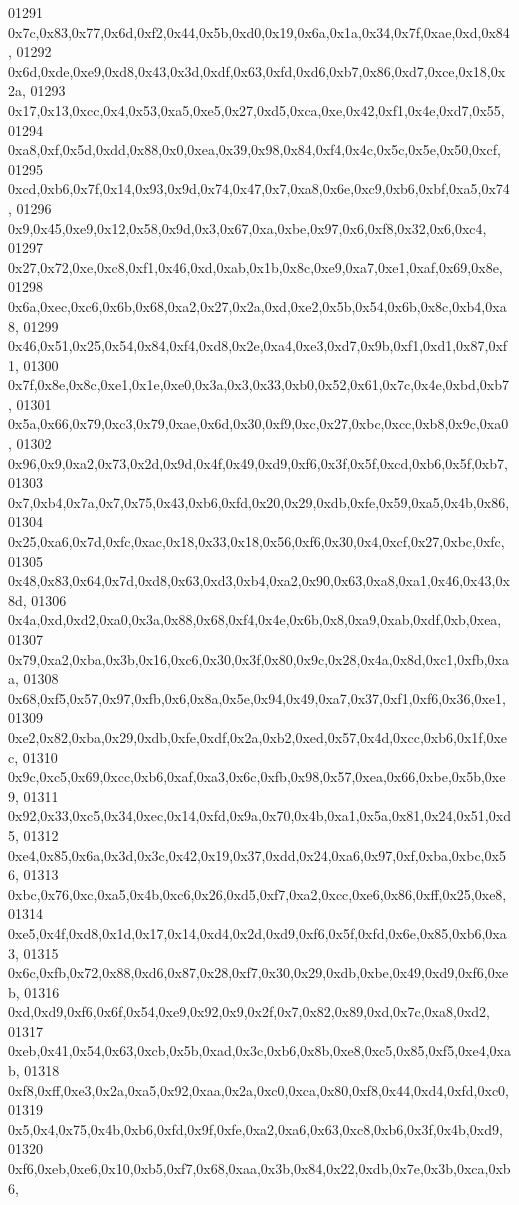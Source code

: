 \begin{DoxyCode}
01291   0x7c,0x83,0x77,0x6d,0xf2,0x44,0x5b,0xd0,0x19,0x6a,0x1a,0x34,0x7f,0xae,0xd,0x84,
01292   0x6d,0xde,0xe9,0xd8,0x43,0x3d,0xdf,0x63,0xfd,0xd6,0xb7,0x86,0xd7,0xce,0x18,0x2a,
01293   0x17,0x13,0xcc,0x4,0x53,0xa5,0xe5,0x27,0xd5,0xca,0xe,0x42,0xf1,0x4e,0xd7,0x55,
01294   0xa8,0xf,0x5d,0xdd,0x88,0x0,0xea,0x39,0x98,0x84,0xf4,0x4c,0x5c,0x5e,0x50,0xcf,
01295   0xcd,0xb6,0x7f,0x14,0x93,0x9d,0x74,0x47,0x7,0xa8,0x6e,0xc9,0xb6,0xbf,0xa5,0x74,
01296   0x9,0x45,0xe9,0x12,0x58,0x9d,0x3,0x67,0xa,0xbe,0x97,0x6,0xf8,0x32,0x6,0xc4,
01297   0x27,0x72,0xe,0xc8,0xf1,0x46,0xd,0xab,0x1b,0x8c,0xe9,0xa7,0xe1,0xaf,0x69,0x8e,
01298   0x6a,0xec,0xc6,0x6b,0x68,0xa2,0x27,0x2a,0xd,0xe2,0x5b,0x54,0x6b,0x8c,0xb4,0xa8,
01299   0x46,0x51,0x25,0x54,0x84,0xf4,0xd8,0x2e,0xa4,0xe3,0xd7,0x9b,0xf1,0xd1,0x87,0xf1,
01300   0x7f,0x8e,0x8c,0xe1,0x1e,0xe0,0x3a,0x3,0x33,0xb0,0x52,0x61,0x7c,0x4e,0xbd,0xb7,
01301   0x5a,0x66,0x79,0xc3,0x79,0xae,0x6d,0x30,0xf9,0xc,0x27,0xbc,0xcc,0xb8,0x9c,0xa0,
01302   0x96,0x9,0xa2,0x73,0x2d,0x9d,0x4f,0x49,0xd9,0xf6,0x3f,0x5f,0xcd,0xb6,0x5f,0xb7,
01303   0x7,0xb4,0x7a,0x7,0x75,0x43,0xb6,0xfd,0x20,0x29,0xdb,0xfe,0x59,0xa5,0x4b,0x86,
01304   0x25,0xa6,0x7d,0xfc,0xac,0x18,0x33,0x18,0x56,0xf6,0x30,0x4,0xcf,0x27,0xbc,0xfc,
01305   0x48,0x83,0x64,0x7d,0xd8,0x63,0xd3,0xb4,0xa2,0x90,0x63,0xa8,0xa1,0x46,0x43,0x8d,
01306   0x4a,0xd,0xd2,0xa0,0x3a,0x88,0x68,0xf4,0x4e,0x6b,0x8,0xa9,0xab,0xdf,0xb,0xea,
01307   0x79,0xa2,0xba,0x3b,0x16,0xc6,0x30,0x3f,0x80,0x9c,0x28,0x4a,0x8d,0xc1,0xfb,0xaa,
01308   0x68,0xf5,0x57,0x97,0xfb,0x6,0x8a,0x5e,0x94,0x49,0xa7,0x37,0xf1,0xf6,0x36,0xe1,
01309   0xe2,0x82,0xba,0x29,0xdb,0xfe,0xdf,0x2a,0xb2,0xed,0x57,0x4d,0xcc,0xb6,0x1f,0xec,
01310   0x9c,0xc5,0x69,0xcc,0xb6,0xaf,0xa3,0x6c,0xfb,0x98,0x57,0xea,0x66,0xbe,0x5b,0xe9,
01311   0x92,0x33,0xc5,0x34,0xec,0x14,0xfd,0x9a,0x70,0x4b,0xa1,0x5a,0x81,0x24,0x51,0xd5,
01312   0xe4,0x85,0x6a,0x3d,0x3c,0x42,0x19,0x37,0xdd,0x24,0xa6,0x97,0xf,0xba,0xbc,0x56,
01313   0xbc,0x76,0xc,0xa5,0x4b,0xc6,0x26,0xd5,0xf7,0xa2,0xcc,0xe6,0x86,0xff,0x25,0xe8,
01314   0xe5,0x4f,0xd8,0x1d,0x17,0x14,0xd4,0x2d,0xd9,0xf6,0x5f,0xfd,0x6e,0x85,0xb6,0xa3,
01315   0x6c,0xfb,0x72,0x88,0xd6,0x87,0x28,0xf7,0x30,0x29,0xdb,0xbe,0x49,0xd9,0xf6,0xeb,
01316   0xd,0xd9,0xf6,0x6f,0x54,0xe9,0x92,0x9,0x2f,0x7,0x82,0x89,0xd,0x7c,0xa8,0xd2,
01317   0xeb,0x41,0x54,0x63,0xcb,0x5b,0xad,0x3c,0xb6,0x8b,0xe8,0xc5,0x85,0xf5,0xe4,0xab,
01318   0xf8,0xff,0xe3,0x2a,0xa5,0x92,0xaa,0x2a,0xc0,0xca,0x80,0xf8,0x44,0xd4,0xfd,0xc0,
01319   0x5,0x4,0x75,0x4b,0xb6,0xfd,0x9f,0xfe,0xa2,0xa6,0x63,0xc8,0xb6,0x3f,0x4b,0xd9,
01320   0xf6,0xeb,0xe6,0x10,0xb5,0xf7,0x68,0xaa,0x3b,0x84,0x22,0xdb,0x7e,0x3b,0xca,0xb6,

\end{DoxyCode}
